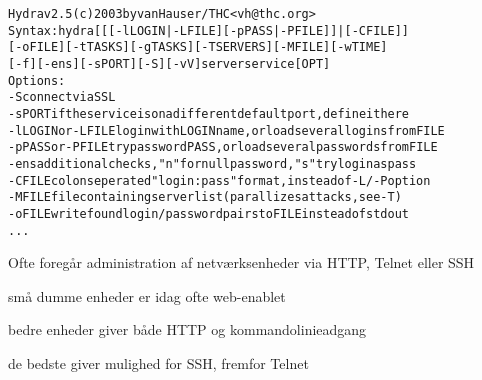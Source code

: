 \documentclass[Screen16to9,17pt]{foils}
\begin{document}
\begin{alltt}
\small
Hydra v2.5 (c) 2003 by van Hauser / THC <vh@thc.org>
Syntax: hydra [[[-l LOGIN|-L FILE] [-p PASS|-P FILE]] | [-C FILE]]
[-o FILE] [-t TASKS] [-g TASKS] [-T SERVERS] [-M FILE] [-w TIME]
[-f] [-e ns] [-s PORT] [-S] [-vV] server service [OPT]
Options:
  -S        connect via SSL
  -s PORT   if the service is on a different default port, define it here
  -l LOGIN  or -L FILE login with LOGIN name, or load several logins from FILE
  -p PASS   or -P FILE try password PASS, or load several passwords from FILE
  -e ns     additional checks, "n" for null password, "s" try login as pass
  -C FILE   colon seperated "login:pass" format, instead of -L/-P option
  -M FILE   file containing server list (parallizes attacks, see -T)
  -o FILE   write found login/password pairs to FILE instead of stdout
...
\end{alltt}



\begin{list1}
\item Ofte foregår administration af netværksenheder via HTTP, Telnet eller SSH
\begin{list2}
\item små dumme enheder er idag ofte web-enablet
\item bedre enheder giver både HTTP og kommandolinieadgang
\item de bedste giver mulighed for SSH, fremfor Telnet
\end{list2}
\end{list1}


\slidenext
\end{document}
